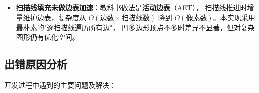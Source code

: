 \documentclass[12pt, a4paper]{article}
\begin{document}
\begin{itemize}[leftmargin=*]

    \item \textbf{扫描线填充未做边表加速}：教科书做法是\textbf{活动边表}（AET），
    扫描线推进时增量维护边表，复杂度从 $O(\text{边数} \times \text{扫描线数})$
    降到 $O(\text{像素数})$。本实现采用最朴素的"逐扫描线遍历所有边"，
    凹多边形顶点不多时差异不显著，但对复杂图形仍有优化空间。

\end{itemize}

\subsection{出错原因分析}

开发过程中遇到的主要问题及解决：
\end{document}
